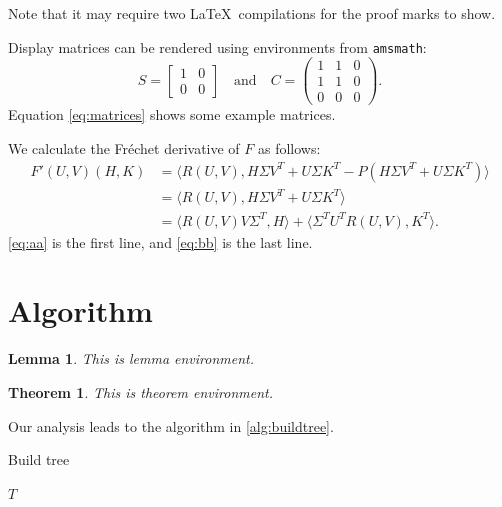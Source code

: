 \documentclass[10pt,reqno,final]{amsart}
\numberwithin{equation}{section}
\numberwithin{figure}{section}
\numberwithin{table}{section}
\theoremstyle{plain}
\newtheorem{theorem}{Theorem}[section]
\newtheorem{lemma}{Lemma}[section]
\theoremstyle{definition}
\theoremstyle{remark}
\begin{document}
Note that it may require two \LaTeX\ compilations for the proof marks
to show.

Display matrices can be rendered using environments from \texttt{amsmath}:
\begin{equation}\label{eq:matrices}
S=\begin{bmatrix}1&0\\0&0\end{bmatrix}
\quad\text{and}\quad
C=\begin{pmatrix}1&1&0\\1&1&0\\0&0&0\end{pmatrix}.
\end{equation}
Equation \ref{eq:matrices} shows some example matrices.

We calculate the Fr\'{e}chet derivative of $F$ as follows:
\begin{subequations}
\begin{align}
  F'(U,V)(H,K)
  &= \langle R(U,V),H\Sigma V^{T} + U\Sigma K^{T} -
  P(H\Sigma V^{T} + U\Sigma K^{T})\rangle \label{eq:aa} \\
  &= \langle R(U,V),H\Sigma V^{T} + U\Sigma K^{T}\rangle
  \nonumber \\
  &= \langle R(U,V)V\Sigma^{T},H\rangle +
  \langle \Sigma^{T}U^{T}R(U,V),K^{T}\rangle. \label{eq:bb}
\end{align}
\end{subequations}
\ref{eq:aa} is the first line, and \ref{eq:bb} is the last line.

\section{Algorithm}
\label{sec:alg}

\lipsum[40]

\begin{lemma}
  This is lemma environment.
\end{lemma}


\begin{theorem}
  This is theorem environment.
\end{theorem}


Our analysis leads to the algorithm in \ref{alg:buildtree}.

\begin{algorithm}
\caption{Build tree}
\label{alg:buildtree}
\begin{algorithmic}
\ENDWHILE
\RETURN $T$
\end{algorithmic}
\end{algorithm}
\end{document}
